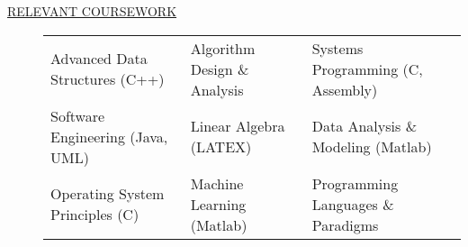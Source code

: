 \documentclass[12pt]{article}
\begin{document}
\begin{description}
\begin{tabular}{l|l}
            \end{tabular}

        \iffalse
        \item[\underline{RELEVANT COURSEWORK}]\hfill

            \begin{tabular}{l|l|l}
                Advanced Data Structures (C++)& Algorithm Design \& Analysis & Systems Programming (C, Assembly)\\
             Software Engineering (Java, UML) & Linear Algebra (LATEX) &  Data Analysis \& Modeling (Matlab) \\
                  Operating System Principles (C) & Machine Learning (Matlab) & Programming Languages \& Paradigms\\
            \end{tabular}


\end{description}
\end{document}
